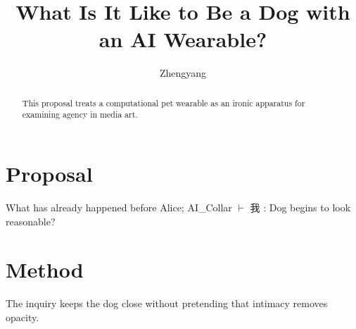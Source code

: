 \documentclass[12pt]{article}
\title{What Is It Like to Be a Dog with an AI Wearable?}
\author{Zhengyang}
\date{}
\begin{document}
\maketitle

\begin{abstract}
This proposal treats a computational pet wearable as an ironic apparatus for examining agency in media art.
\end{abstract}

\section{Proposal}
What has already happened before Alice; AI\_Collar $\vdash$ 我 : Dog begins to look reasonable?

\section{Method}
The inquiry keeps the dog close without pretending that intimacy removes opacity.
\end{document}
